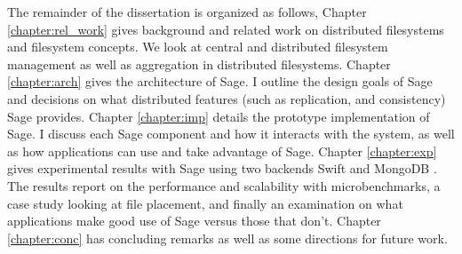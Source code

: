 The remainder of the dissertation is organized as follows, Chapter
\ref{chapter:rel_work} gives background and related work on distributed
filesystems and filesystem concepts. We look at central and distributed
filesystem management as well as aggregation in distributed filesystems.
Chapter \ref{chapter:arch} gives the architecture of Sage. I outline the
design goals of Sage and decisions on what distributed features (such as
replication, and consistency) Sage provides. Chapter \ref{chapter:imp} details
the prototype implementation of Sage. I discuss each Sage component and how it
interacts with the system, as well as how applications can use and take
advantage of Sage. Chapter \ref{chapter:exp} gives experimental results with
Sage using two backends Swift and MongoDB \cite{mongo}. The results report on the
performance and scalability with microbenchmarks, a case study looking at file
placement, and finally an examination on what applications make good use of
Sage versus those that don’t. Chapter \ref{chapter:conc} has concluding
remarks as well as some directions for future work.
